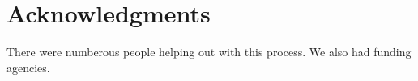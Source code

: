 \section{Acknowledgments}
\label{sec:Acknowledgments}
There were numberous people helping out with this process.
We also had funding agencies.


